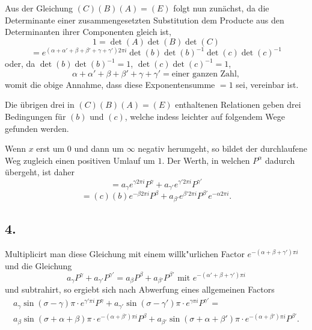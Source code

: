 \documentclass[12pt,a4paper]{article}
\begin{document}
Aus der Gleichung $(C)(B)(A) = (E)$ folgt nun zunächst, da die Determinante einer zusammengesetzten Substitution dem Producte aus den Determinanten ihrer Componenten gleich ist,
\[
1 = \det(A) \det(B) \det(C)
\]
\[
= e^{(\alpha+\alpha'+\beta+\beta'+\gamma+\gamma')2\pi i} \det(b) \det(b)^{-1} \det(c) \det(c)^{-1}
\]
oder, da $\det(b) \det(b)^{-1} = 1$, $\det(c) \det(c)^{-1} = 1$,
\begin{equation}
\alpha + \alpha' + \beta + \beta' + \gamma + \gamma' = \text{einer ganzen Zahl}, \tag{2}
\end{equation}
womit die obige Annahme, dass diese Exponentensumme $= 1$ sei, vereinbar ist.

Die übrigen drei in $(C)(B)(A) = (E)$ enthaltenen Relationen geben drei Bedingungen für $(b)$ und $(c)$, welche indess leichter auf folgendem Wege gefunden werden.

Wenn $x$ erst um $0$ und dann um $\infty$ negativ herumgeht, so bildet der durchlaufene Weg zugleich einen positiven Umlauf um $1$. Der Werth, in welchen $P^{\alpha}$ dadurch übergeht, ist daher
\[
= a_{\gamma} e^{\gamma 2\pi i} P^{\gamma} + a_{\gamma'} e^{\gamma' 2\pi i} P^{\gamma'}
\]
\[
= (c)(b) e^{-\beta 2\pi i} P^{\beta} + a_{\beta'} e^{\beta' 2\pi i} P^{\beta'} e^{-\alpha 2\pi i}.
\]

\subsection*{4.}

Multiplicirt man diese Gleichung mit einem willk{"u}rlichen Factor $e^{-(\alpha+\beta+\gamma')\pi i}$ und die Gleichung
\[
a_{\gamma} P^{\gamma} + a_{\gamma'} P^{\gamma'} = a_{\beta} P^{\beta} + a_{\beta'} P^{\beta'} \text{ mit } e^{-(\alpha'+\beta+\gamma')\pi i}
\]
und subtrahirt, so ergiebt sich nach Abwerfung eines allgemeinen Factors
\begin{multline*}
a_{\gamma} \sin(\sigma - \gamma)\pi \cdot e^{\gamma'\pi i} P^{\gamma} + a_{\gamma'} \sin(\sigma - \gamma')\pi \cdot e^{\gamma\pi i} P^{\gamma'} = \\
a_{\beta} \sin(\sigma + \alpha + \beta)\pi \cdot e^{-(\alpha+\beta')\pi i} P^{\beta} + a_{\beta'} \sin(\sigma + \alpha + \beta')\pi \cdot e^{-(\alpha+\beta')\pi i} P^{\beta'}.
\end{multline*}
\end{document}
